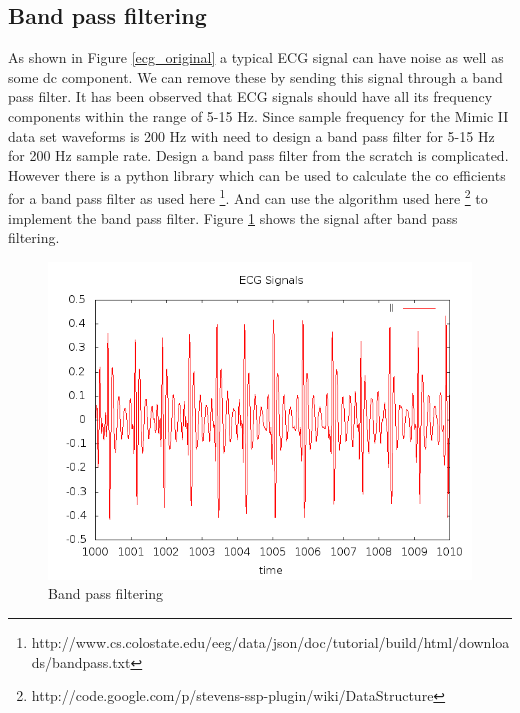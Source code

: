 \subsection{Band pass filtering}
As shown in Figure \ref{ecg_original} a typical ECG signal can have noise as well as some dc component. We can remove these by sending this signal through a band pass filter. It has been observed that ECG signals should have all its frequency components within the range of 5-15 Hz. Since sample frequency for the Mimic II data set waveforms is 200 Hz with need to design a band pass filter for 5-15 Hz for 200 Hz sample rate. Design a band pass filter from the scratch is complicated. However there is a python library which can be used to calculate the co efficients for a band pass filter as used here \footnote{http://www.cs.colostate.edu/eeg/data/json/doc/tutorial/build/html/downloads/bandpass.txt}. And can use the algorithm used here \footnote{http://code.google.com/p/stevens-ssp-plugin/wiki/DataStructure} to implement the band pass filter. 
Figure \ref{band_pass_filter} shows the signal after band pass filtering.
\begin{figure}
        \centering
        \includegraphics[width=\textwidth]{ecg_filtered.png}
        \caption{Band pass filtering}
        \label{band_pass_filter}
\end{figure}
